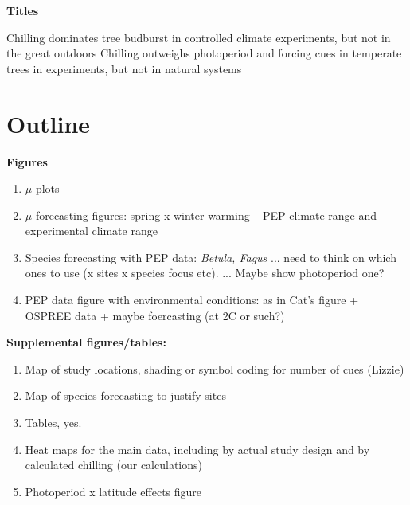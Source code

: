 \documentclass[11pt,letter]{article}
\begin{document}

\renewcommand{\refname}{\CHead{}}


{\bf Titles}

Chilling dominates tree budburst in controlled climate experiments, but not in the great outdoors
Chilling outweighs photoperiod and forcing cues in temperate trees in experiments, but not in natural systems

\section{Outline}

{\bf Figures}

\begin{enumerate}
\item $\mu$ plots
\item  $\mu$ forecasting figures: spring x winter warming -- PEP climate range and experimental climate range
\item Species forecasting with PEP data: \emph{Betula, Fagus} ... need to think on which ones to use (x sites x species focus etc). ... Maybe show photoperiod one?
\item PEP data figure with environmental conditions: as in Cat's figure + OSPREE data + maybe foercasting (at 2C or such?)
\end{enumerate}


{\bf Supplemental figures/tables:}
\begin{enumerate}
\item Map of study locations, shading or symbol coding for number of cues (Lizzie)
\item Map of species forecasting to justify sites
\item Tables, yes.
\item Heat maps for the main data, including by actual study design and by calculated chilling (our calculations)
\item Photoperiod x latitude effects figure
\end{enumerate}
\end{document}
